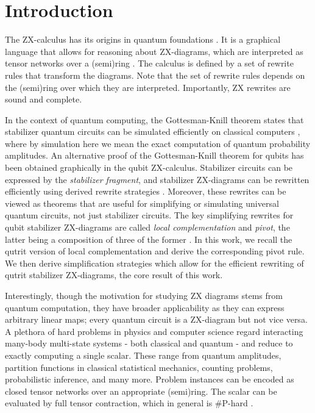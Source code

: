 \section{Introduction}



The ZX-calculus has its origins in
quantum foundations \cite{Coecke2011,vandewetering2020zxcalculus}.
It is a graphical language that allows for reasoning about ZX-diagrams,
which are interpreted as tensor networks over
a (semi)ring \cite{wang2020completeness}.
The calculus
is defined by a set of rewrite rules
that transform the diagrams.
Note that the set of rewrite rules depends on
the (semi)ring over which they are interpreted.
Importantly, ZX rewrites are sound and complete.


In the context of quantum computing,
the Gottesman-Knill theorem states that stabilizer quantum
circuits can be
simulated efficiently on classical computers \cite{Aaronson2004},
where by simulation here we mean the exact computation of quantum probability amplitudes.
An alternative
proof of the Gottesman-Knill theorem for qubits has been obtained graphically in the qubit ZX-calculus.
Stabilizer circuits can be expressed by the \emph{stabilizer
fragment},
and stabilizer ZX-diagrams can be rewritten efficiently
using derived rewrite strategies \cite{graph_theoretic_simplification}.
Moreover, these rewrites can be viewed as theorems
that are useful for simplifying or simulating universal quantum circuits, not just stabilizer circuits.
The key simplifying rewrites
for qubit stabilizer ZX-diagrams
are called \emph{local complementation} and \emph{pivot},
the latter being a composition of three of the former \cite{graph_theoretic_simplification, Duncan_2014, Van_den_Nest_2005}.
In this work, we recall the qutrit version of local complementation \cite{harny_completeness} and derive the corresponding pivot rule.
We then derive simplification strategies
which allow for the efficient rewriting of qutrit stabilizer ZX-diagrams,
the core result of this work.

Interestingly, though the motivation for studying ZX diagrams stems from quantum computation, they have broader applicability as they
can express arbitrary linear maps;
every quantum circuit is a ZX-diagram but not vice versa.
A plethora of hard problems in physics and computer science
regard interacting many-body multi-state systems - both classical and quantum -
and reduce to exactly computing a single scalar.
These range from quantum amplitudes,
partition functions in classical statistical mechanics,
counting problems, probabilistic inference, and many more.
Problem instances can be encoded as closed
tensor networks over an appropriate (semi)ring.
The scalar can be evaluated by full tensor contraction,
which in general is \#P-hard \cite{Damm2002}.


